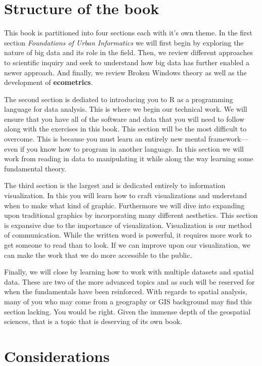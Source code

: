 \documentclass[
]{book}
\begin{document}
\hypertarget{structure-of-the-book}{%
\section{Structure of the book}\label{structure-of-the-book}}

This book is partitioned into four sections each with it's own theme. In the first section \emph{Foundations of Urban Informatics} we will first begin by exploring the nature of big data and its role in the field. Then, we review different approaches to scientific inquiry and seek to understand how big data has further enabled a newer approach. And finally, we review Broken Windows theory as well as the development of \textbf{ecometrics}.

The second section is dediated to introducing you to R as a programming language for data analysis. This is where we begin our technical work. We will ensure that you have all of the software and data that you will need to follow along with the exercises in this book. This section will be the most difficult to overcome. This is because you must learn an entirely new mental framework---even if you know how to program in another language. In this section we will work from reading in data to manipulating it while along the way learning some fundamental theory.

The third section is the largest and is dedicated entirely to information visualization. In this you will learn how to craft visualizations and understand when to make what kind of graphic. Furthermore we will dive into expanding upon traditional graphics by incorporating many different aesthetics. This section is expansive due to the importance of visualization. Visualization is our method of communication. While the written word is powerful, it requires more work to get someone to read than to look. If we can improve upon our visualization, we can make the work that we do more accessible to the public.

Finally, we will close by learning how to work with multiple datasets and spatial data. These are two of the more advanced topics and as such will be reserved for when the fundamentals have been reinforced. With regards to spatial analysis, many of you who may come from a geography or GIS background may find this section lacking. You would be right. Given the immense depth of the geospatial sciences, that is a topic that is deserving of its own book.

\hypertarget{considerations}{%
\section{Considerations}\label{considerations}}
\end{document}
